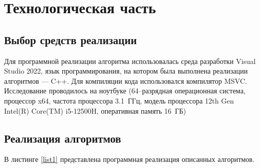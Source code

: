 \chapter{Технологическая часть}

\section{Выбор средств реализации}
Для программной реализации алгоритма использовалась среда разработки Visual Studio 2022, язык программирования, на котором была выполнена реализации алгоритмов --- C++.
Для компиляции кода использовался компилятор MSVC. Исследование проводилось на ноутбуке (64--разрядная операционная система, процессор x64, частота процессора 3.1~ГГц, модель процессора 12th Gen Intel(R) Core(TM) i5-12500H, оперативная память 16~ГБ)
\section{Реализация алгоритмов}
В листинге \ref{list1} представлена программная реализация описанных алгоритмов.

